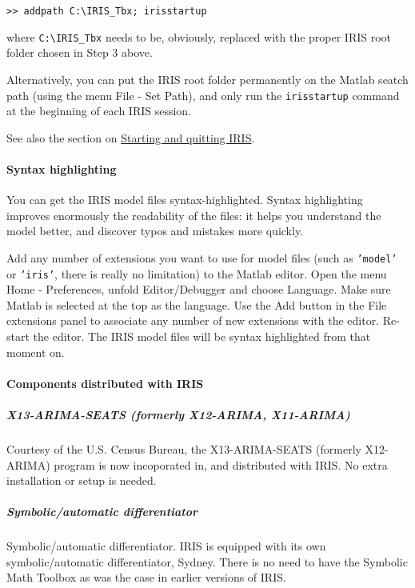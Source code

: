 \begin{verbatim}
>> addpath C:\IRIS_Tbx; irisstartup
\end{verbatim}

where \texttt{C:\textbackslash{}IRIS\_Tbx} needs to be, obviously,
replaced with the proper IRIS root folder chosen in Step 3 above.

Alternatively, you can put the IRIS root folder permanently on the
Matlab seatch path (using the menu File - Set Path), and only run the
\texttt{irisstartup} command at the beginning of each IRIS session.

See also the section on \href{config/Contents}{Starting and quitting
IRIS}.

\paragraph{Syntax highlighting}

You can get the IRIS model files syntax-highlighted. Syntax highlighting
improves enormously the readability of the files: it helps you
understand the model better, and discover typos and mistakes more
quickly.

Add any number of extensions you want to use for model files (such as
\texttt{'model'} or \texttt{'iris'}, there is really no limitation) to
the Matlab editor. Open the menu Home - Preferences, unfold
Editor/Debugger and choose Language. Make sure Matlab is selected at the
top as the language. Use the Add button in the File extensions panel to
associate any number of new extensions with the editor. Re-start the
editor. The IRIS model files will be syntax highlighted from that moment
on.

\paragraph{Components distributed with
IRIS}

\subparagraph{X13-ARIMA-SEATS (formerly X12-ARIMA,
X11-ARIMA)}

Courtesy of the U.S. Census Bureau, the X13-ARIMA-SEATS (formerly
X12-ARIMA) program is now incoporated in, and distributed with IRIS. No
extra installation or setup is needed.

\subparagraph{Symbolic/automatic
differentiator}

Symbolic/automatic differentiator. IRIS is equipped with its own
symbolic/automatic differentiator, Sydney. There is no need to have the
Symbolic Math Toolbox as was the case in earlier versions of IRIS.



